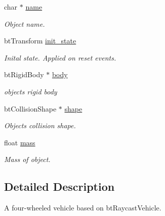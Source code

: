 \begin{DoxyCompactItemize}
\mbox{\label{classbtosgObject_a12396e1362797a75473a2e833b579cc9}} 
char $\ast$ \hyperlink{classbtosgObject_a12396e1362797a75473a2e833b579cc9}{name}
\begin{DoxyCompactList}\small\item\em Object name. \end{DoxyCompactList}\item 
\mbox{\label{classbtosgObject_a2dee023f311114e200df9b04c8c1b400}} 
bt\+Transform \hyperlink{classbtosgObject_a2dee023f311114e200df9b04c8c1b400}{init\+\_\+state}
\begin{DoxyCompactList}\small\item\em Inital state. Applied on reset events. \end{DoxyCompactList}\item 
\mbox{\label{classbtosgObject_a64ccde0543c184ed1749fdb9c9699785}} 
bt\+Rigid\+Body $\ast$ \hyperlink{classbtosgObject_a64ccde0543c184ed1749fdb9c9699785}{body}
\begin{DoxyCompactList}\small\item\em object\textquotesingle{}s rigid body \end{DoxyCompactList}\item 
\mbox{\label{classbtosgObject_a0f6a8da01cf643c321bffe86e42604b0}} 
bt\+Collision\+Shape $\ast$ \hyperlink{classbtosgObject_a0f6a8da01cf643c321bffe86e42604b0}{shape}
\begin{DoxyCompactList}\small\item\em Object\textquotesingle{}s collision shape. \end{DoxyCompactList}\item 
\mbox{\label{classbtosgObject_a2418bb2194d5e9b0f1c51c84672ba7d1}} 
float \hyperlink{classbtosgObject_a2418bb2194d5e9b0f1c51c84672ba7d1}{mass}
\begin{DoxyCompactList}\small\item\em Mass of object. \end{DoxyCompactList}\end{DoxyCompactItemize}


\subsection{Detailed Description}
A four-\/wheeled vehicle based on bt\+Raycast\+Vehicle. 

